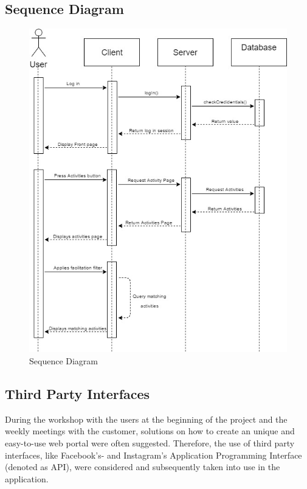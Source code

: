 \subsection{Sequence Diagram}


\begin{figure}[H]
\centering
    \includegraphics[width=\textwidth]{fig/Sequence_diagram}
\caption{Sequence Diagram}
\label{Sequence_Diagram}
\end{figure}

\subsection{Third Party Interfaces}
During the workshop with the users at the beginning of the project and the weekly meetings with the customer, solutions on how to create an unique and easy-to-use web portal were often suggested. Therefore, the use of third party interfaces, like Facebook's- and Instagram's Application Programming Interface (denoted as API), were considered and subsequently taken into use in the application. 

